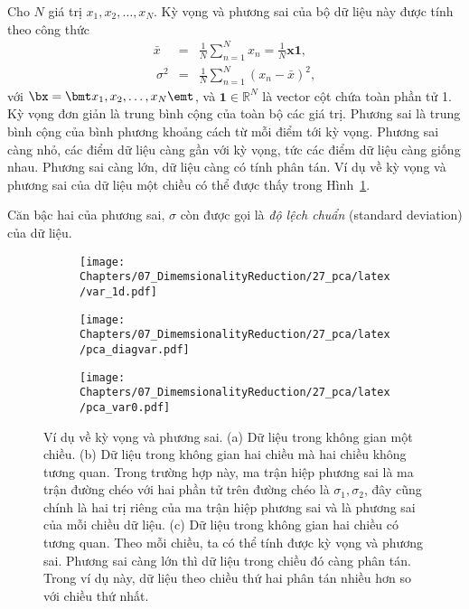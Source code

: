 Cho $N$ giá trị $x_1, x_2, \dots, x_N$. {Kỳ vọng} và {phương sai}
của bộ dữ liệu này được tính theo công thức
\begin{eqnarray} 
    \bar{x} &=& \frac{1}{N}\sum_{n=1}^N x_n = \frac{1}{N}\mathbf{x1},\\\ 
    \sigma^2 &=& \frac{1}{N} \sum_{n=1}^N (x_n - \bar{x})^2,
\end{eqnarray} 
với $\bx = \bmt x_1, x_2, \dots, x_N\emt $, và $\mathbf{1} \in \mathbb{R}^N$ là
vector cột chứa toàn phần tử 1. Kỳ vọng đơn giản là trung bình cộng của toàn bộ
các giá trị. Phương sai là trung bình cộng của bình phương khoảng cách từ mỗi
điểm tới kỳ vọng. Phương sai càng nhỏ, các điểm dữ liệu càng gần với kỳ vọng,
tức các điểm dữ liệu càng giống nhau. Phương sai càng lớn, dữ liệu càng có tính
phân tán. Ví dụ về kỳ vọng và phương sai của dữ liệu một chiều có thể được thấy
trong Hình~\ref{fig:27_2a}. 

Căn bậc hai của phương sai, $\sigma$ còn được gọi là \textit{độ lệch chuẩn} (standard deviation) của
dữ liệu.
 
 
 \begin{figure}[t]
     \begin{subfigure}{0.325\textwidth}
     \texttt{[image: Chapters/07\_DimemsionalityReduction/27\_pca/latex/var\_1d.pdf]}
     \caption{}
     \label{fig:27_2a}
     \end{subfigure}
     \begin{subfigure}{0.325\textwidth}
     \texttt{[image: Chapters/07\_DimemsionalityReduction/27\_pca/latex/pca\_diagvar.pdf]}
     \caption{}
     \label{fig:27_2b}
     \end{subfigure}
     \begin{subfigure}{0.325\textwidth}
     \texttt{[image: Chapters/07\_DimemsionalityReduction/27\_pca/latex/pca\_var0.pdf]}
     \caption{}
     \label{fig:27_2c}
     \end{subfigure}
     \caption{
     Ví dụ về kỳ vọng và phương sai. (a) Dữ liệu trong không gian
     một chiều. (b) Dữ liệu trong không gian hai chiều mà hai chiều
     không tương quan. Trong trường hợp này, ma trận hiệp phương sai là ma trận
     đường chéo với hai phần tử trên đường chéo  là $\sigma_1, \sigma_2$, đây
     cũng chính là hai trị riêng của ma trận hiệp phương sai và là phương sai
     của mỗi chiều dữ liệu. (c) Dữ liệu trong không gian hai chiều có tương
     quan. Theo mỗi chiều, ta có thể tính được kỳ vọng và phương sai. Phương sai
     càng lớn thì dữ liệu trong chiều đó càng phân tán. Trong ví dụ này, dữ liệu
     theo chiều thứ hai phân tán nhiều hơn so với chiều thứ nhất. }
     \label{fig:27_2}
 \end{figure}

